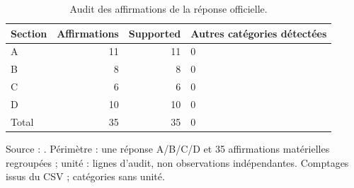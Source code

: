 \begin{table}[!htbp]
\centering
\caption{Audit des affirmations de la réponse officielle.}
\label{tab:llm}
\small
\setlength{\tabcolsep}{4pt}
\renewcommand{\arraystretch}{1.16}
\begin{tabularx}{\linewidth}{XrrX}
\toprule
\textbf{Section} & \textbf{Affirmations} & \textbf{Supported} & \textbf{Autres catégories détectées} \\
\midrule
A & 11 & 11 & 0 \\
B & 8 & 8 & 0 \\
C & 6 & 6 & 0 \\
D & 10 & 10 & 0 \\
Total & 35 & 35 & 0 \\
\bottomrule
\end{tabularx}
\par\smallskip
\begin{minipage}{\linewidth}\footnotesize Source : . Périmètre : une réponse A/B/C/D et 35 affirmations matérielles regroupées ; unité : lignes d’audit, non observations indépendantes. Comptages issus du CSV ; catégories sans unité.
\end{minipage}
\end{table}
